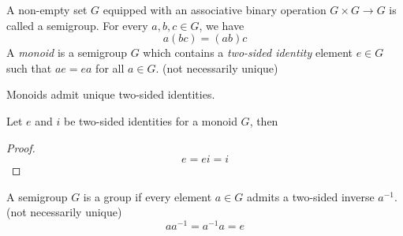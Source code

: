 \documentclass[../main-manifolds.tex]{subfiles}
\begin{document}
\newpage


\begin{definition}\label{hungerford-chp1:semigroups-monoids-definition}
    A non-empty set $G$ equipped with an associative binary operation $G\times G\to G$ is called a semigroup. For every $a,b,c\in G$, we have
    \begin{equation}\label{hungerford-chp1:associativity-semigroup}
        a(bc) = (ab)c 
    \end{equation}
    A \emph{monoid} is a semigroup $G$ which contains a \emph{two-sided identity} element $e\in G$ such that $ae = ea$ for all $a\in G$. (not necessarily unique)
\end{definition}

Monoids admit unique two-sided identities.
\begin{lemma}\label{hungerford-chp1:monoid-unique-identity}
    Let $e$ and $i$ be two-sided identities for a monoid $G$, then
    \begin{proof}
    \[
        e = ei = i
    \]    
    \end{proof}
\end{lemma}
    



\begin{definition}[Group]\label{hungerford-chp1:group-definition}
    A semigroup $G$ is a group if every element $a\in G$ admits a two-sided inverse $a^{-1}$. (not necessarily unique)
    \[
        aa^{-1} = a^{-1}a = e
    \]
\end{definition}
\end{document}
